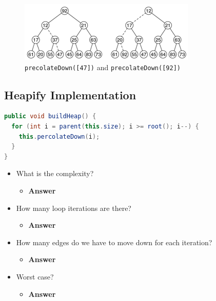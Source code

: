 \documentclass[
  10pt,
  english,
  letterpaper,
,tablecaptionabove
]{scrartcl}
\newcommand{\passthrough}[1]{#1}
\providecommand{\tightlist}{%
  \setlength{\itemsep}{0pt}\setlength{\parskip}{0pt}}
\begin{document}
\begin{figure}
\centering
\includegraphics[width=0.75\textwidth,height=\textheight]{images/5.png}
\caption{\passthrough{\lstinline!precolateDown([47])!} and
\passthrough{\lstinline!precolateDown([92])!}}
\end{figure}

\hypertarget{heapify-implementation}{%
\subsection{Heapify Implementation}\label{heapify-implementation}}

\begin{lstlisting}[language=Java]
public void buildHeap() {
  for (int i = parent(this.size); i >= root(); i--) {
    this.percolateDown(i);
  }
}
\end{lstlisting}

\begin{itemize}
\tightlist
\item
  What is the complexity?

  \begin{itemize}
  \tightlist
  \item
    \textbf{Answer}
  \end{itemize}
\item
  How many loop iterations are there?

  \begin{itemize}
  \tightlist
  \item
    \textbf{Answer}
  \end{itemize}
\item
  How many edges do we have to move down for each iteration?

  \begin{itemize}
  \tightlist
  \item
    \textbf{Answer}
  \end{itemize}
\item
  Worst case?

  \begin{itemize}
  \tightlist
  \item
    \textbf{Answer}
  \end{itemize}
\end{itemize}
\end{document}
